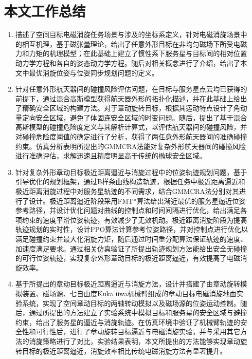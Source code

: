 \documentclass[lang=chs, degree=master, blindreview=false, winfonts=true]{yanputhesis}
\begin{document}
\section{本文工作总结}
\begin{enumerate}
	\item 描述了空间目标电磁消旋任务场景与涉及的坐标系定义，针对电磁消旋场景中的相互机理，基于磁张量理论，给出了任意外形目标在非均匀磁场下所受电磁力和力矩的机理模型；在此基础上建立了惯性系下服务星与目标间的相对位置动力学方程和各自的姿态动力学方程。随后对相关概念进行了介绍，给出了本文中最优消旋位姿与位姿同步规划问题的定义。
	
	\item 针对任意外形航天器间的碰撞风险评估问题，在目标与服务星点云均已获得的前提下，通过混合高斯模型获得航天器外形的拓扑化描述，并在此基础上给出了精确安全区域的构建方法。对于章动旋转目标，根据其运动特点设计了角动量定向安全区域，避免了体固连安全区域的时变问题。随后，提出了基于混合高斯模型的碰撞危险度定义与其解析计算式，以评估航天器间的碰撞风险，并对碰撞危险度阈值的确定进行了分析，获得了两任意外形航天器间的准确碰撞约束。仿真分析表明所提出的GMMCRA法能对复杂外形航天器间的碰撞风险进行准确评估，求解迅速且精度明显高于传统的椭球安全区域。
	
	\item 针对复杂外形章动目标极近距离逼近与消旋过程中的位姿轨迹规划问题，基于引导优化的规划框架，通过B样条曲线构造轨迹，根据任务中极近距离逼近和极近距离消旋过程中对服务星轨迹的不同需求，结合GMMCRA法分别对其进行了设计。极近距离逼近阶段采用FMT*算法给出渐近最优的服务星逼近位姿参考路径，并设计优化问题对曲线的控制点和时间间隔进行优化，给出满足各项约束的速度平滑位姿轨迹，有效减少了无效机动。极近距离消旋阶段为提高轨迹规划的实时性，设计PPO算法计算参考位姿路径，并对控制点进行优化以满足碰撞约束并最大化消旋力矩，随后通过时间重分配算法保证轨迹的速度、加速度满足要求。通过相关仿真验证了所提出轨迹规划方法能给出安全无碰撞的可行位姿轨迹，实现复杂外形章动目标的极近距离逼近，有效提高了电磁消旋效率。
	
	\item 基于所提出的章动目标极近距离逼近与消旋方法，设计并搭建了由章动旋转模拟装置、磁场源、七自由度Kuka iiwa机械臂组成的章动目标电磁消旋地面实验系统，实现了空间章动目标的两轴转动模拟以及磁场源的位姿运动控制。随后，通过所提出的方法建立了实验系统中模拟目标和服务星的安全区域与避撞约束，给出了服务星的逼近与消旋轨迹。在仿真环境中验证了机械臂轨迹的安全性和可行性后，进行了章动旋转目标逼近与电磁消旋实验，并与采用其它方法的消旋策略进行了对比，实验结果表明，本文所提出的方法能够实现章动旋转目标的极近距离逼近，消旋效率相比传统电磁消旋方法有显著提升。
\end{enumerate}
\end{document}
